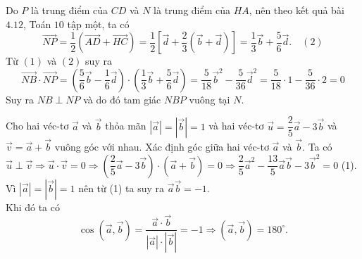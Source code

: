 \begin{bt}
{\begin{enumerate}
{	
			} 
			Do $P$ là trung điểm của $CD$ và $N$ là trung điểm của $HA$, nên theo kết quả bài $4.12$, Toán $10$ tập một, ta có
			\[\overrightarrow{NP}=\dfrac{1}{2}(\overrightarrow{AD}+\overrightarrow{HC})=\dfrac {1}{2}\left[\overrightarrow{d}+\dfrac{2}{3}(\overrightarrow{b}+\overrightarrow {d})\right]=\dfrac {1}{3}\overrightarrow{b}+\dfrac{5}{6}\overrightarrow{d}.\quad(2)\]
			Từ $(1)$ và $(2)$ suy ra
			\[\overrightarrow{NB}\cdot\overrightarrow{NP}=\left(\dfrac{5}{6}\overrightarrow{b}-\dfrac {1}{6}\overrightarrow{d}\right)\cdot\left(\dfrac{1}{3}\overrightarrow{b}+\dfrac{5}{6}\overrightarrow{d}\right)=\dfrac{5}{18}\overrightarrow{b}^2-\dfrac{5}{36}\overrightarrow{d}^2=\dfrac {5}{18}\cdot 1-\dfrac{5}{36}\cdot 2=0\]
			Suy ra $NB \perp NP$ và do đó tam giác $NBP$ vuông tại $N$.
		\end{enumerate}	
	}
\end{bt}

\begin{bt}%
	Cho hai véc-tơ $\overrightarrow{a}$ và $\overrightarrow{b}$ thỏa mãn $\left |\overrightarrow{a} \right |=\left |\overrightarrow{b} \right |=1$ và hai véc-tơ $\overrightarrow{u}=\dfrac{2}{5}\overrightarrow{a}-3\overrightarrow{b}$ và $\overrightarrow{v}=\overrightarrow{a}+\overrightarrow{b}$ vuông góc với nhau. Xác định góc giữa hai véc-tơ $\overrightarrow{a}$ và $\overrightarrow{b}$.
	\loigiai
	{
		Ta có $\overrightarrow{u}\perp\overrightarrow{v}\Rightarrow\overrightarrow{u}\cdot\overrightarrow{v}=0\Rightarrow\left (\dfrac{2}{5}\overrightarrow{a}-3\overrightarrow{b} \right )\cdot\left (\overrightarrow{a}+\overrightarrow{b} \right )=0\Rightarrow \dfrac{2}{5}\overrightarrow{a}^2-\dfrac{13}{5}\overrightarrow{a}\overrightarrow{b}-3\overrightarrow{b}^2=0$ (1).\\
		Vì $\left |\overrightarrow{a} \right |=\left |\overrightarrow{b} \right |=1$ nên từ (1) ta suy ra $\overrightarrow{a}\overrightarrow{b}=-1$.\\
		Khi đó ta có $$\cos\left (\overrightarrow{a},\overrightarrow{b} \right )=\dfrac{\overrightarrow{a}\cdot\overrightarrow{b}}{\left |\overrightarrow{a} \right |\cdot\left |\overrightarrow{b} \right |}=-1\Rightarrow\left (\overrightarrow{a},\overrightarrow{b} \right )=180^{\circ}.$$
	}
\end{bt}

